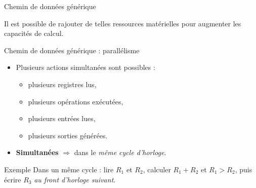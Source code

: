 \begin{frame}{Chemin de donn\'ees g\'en\'erique}
  \centering

  \vspace{2mm}
  \begin{alertblock}{}
    Il est possible de rajouter de telles ressources mat\'erielles pour augmenter les capacit\'es de calcul.
  \end{alertblock}
\end{frame}

\begin{frame}{Chemin de donn\'ees g\'en\'erique : parall\'elisme}
  \begin{itemize}
    \item Plusieurs actions simultan\'ees sont possibles :
    \begin{itemize}
      \item plusieurs registres lus,
      \item plusieurs op\'erations ex\'ecut\'ees,
      \item plusieurs entr\'ees lues,
      \item plusieurs sorties g\'en\'er\'ees.
    \end{itemize}
    \item \textbf{Simultan\'ees} $\Rightarrow$ dans le \emph{m\^eme cycle d'horloge}.
  \end{itemize}
  \begin{exampleblock}{Exemple}
    Dans un m\^eme cycle : lire $R_1$ et $R_2$, calculer $R_1 + R_2$ et $R_1 > R_2$, puis \'ecrire $R_3$ \emph{au front d'horloge suivant}.
  \end{exampleblock}
\end{frame}

